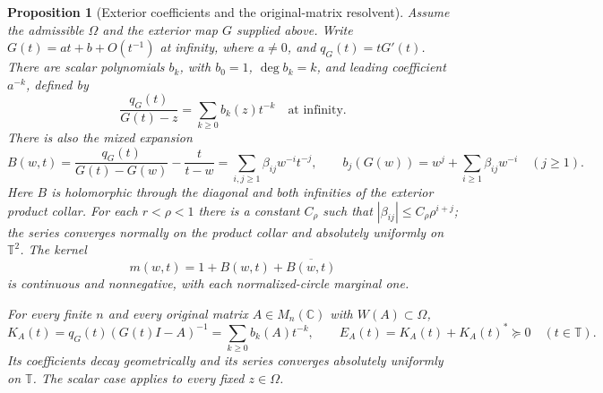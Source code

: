 \documentclass[11pt]{article}
\newcommand{\C}{\mathbb C}
\newcommand{\T}{\mathbb T}
\newtheorem{proposition}[theorem]{Proposition}
\theoremstyle{definition}
\theoremstyle{remark}
\numberwithin{equation}{section}
\begin{document}
\begin{proposition}[Exterior coefficients and the original-matrix resolvent]\label{input:analytic}
Assume the admissible $\Omega$ and the exterior map $G$ supplied above.
Write $G(t)=at+b+O(t^{-1})$ at infinity, where $a\ne0$, and
$q_G(t)=tG'(t)$. There are scalar polynomials
$b_k$, with $b_0=1$, $\deg b_k=k$, and leading coefficient $a^{-k}$,
defined by
\begin{equation}\label{eq:import-faber}
 \frac{q_G(t)}{G(t)-z}=\sum_{k\ge0}b_k(z)t^{-k}
 \quad\text{at infinity}.
\end{equation}
There is also the mixed expansion
\begin{equation}\label{eq:import-kernel}
 B(w,t)=\frac{q_G(t)}{G(t)-G(w)}-\frac{t}{t-w}
       =\sum_{i,j\ge1}\beta_{ij}w^{-i}t^{-j},
 \qquad
 b_j(G(w))=w^j+\sum_{i\ge1}\beta_{ij}w^{-i}\quad(j\ge1).
\end{equation}
Here $B$ is holomorphic through the diagonal and both infinities of the
exterior product collar. For each $r<\rho<1$ there is a constant
$C_\rho$ such that $|\beta_{ij}|\le C_\rho\rho^{i+j}$; the series
converges normally on the product collar and absolutely uniformly on
$\T^2$. The kernel
\[
 m(w,t)=1+B(w,t)+\overline{B(w,t)}
\]
is continuous and nonnegative, with each normalized-circle marginal one.

For every finite $n$ and every original matrix $A\in M_n(\C)$ with
$W(A)\subset\Omega$,
\begin{equation}\label{eq:import-resolvent}
 K_A(t)=q_G(t)(G(t)I-A)^{-1}
       =\sum_{k\ge0}b_k(A)t^{-k},\qquad
 E_A(t)=K_A(t)+K_A(t)^*\succeq0\quad(t\in\T).
\end{equation}
Its coefficients decay geometrically and its series converges absolutely
uniformly on $\T$.
The scalar case applies to every fixed $z\in\Omega$.
\end{proposition}
\end{document}
